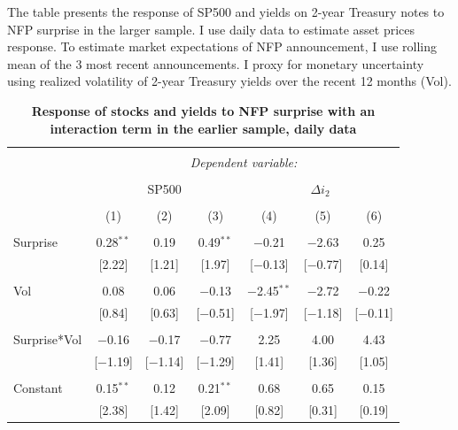 \documentclass[12pt]{article}
\begin{document}
\begin{table}[!htbp] \centering 
  \caption{\textbf{Response of stocks and yields to NFP surprise with an interaction term in the earlier sample, daily data}} 
  \label{} 
      \begin{flushleft}
    {\medskip\small
 The table presents the response of SP500 and yields on 2-year Treasury notes to NFP surprise in the larger sample. I use daily data to estimate asset prices response. To estimate market expectations of NFP announcement, I use rolling mean of the 3 most recent announcements. I proxy for monetary uncertainty using realized volatility of 2-year Treasury yields over the recent 12 months (Vol).}
    \medskip
    \end{flushleft}
\begin{tabular}{@{\extracolsep{1pt}}lcccccc} 
\\[-1.8ex]\hline 
\hline \\[-1.8ex] 
 & \multicolumn{6}{c}{\textit{Dependent variable:}} \\ 
\cline{2-7} 
\\[-1.8ex] & \multicolumn{3}{c}{SP500} & \multicolumn{3}{c}{$\Delta i_2$} \\ 
\\[-1.8ex] & (1) & (2) & (3) & (4) & (5) & (6)\\ 
\hline \\[-1.8ex] 
 Surprise & 0.28$^{**}$ & 0.19 & 0.49$^{**}$ & $-$0.21 & $-$2.63 & 0.25 \\ 
  & [2.22] & [1.21] & [1.97] & [$-$0.13] & [$-$0.77] & [0.14] \\ 
  & & & & & & \\ 
 Vol & 0.08 & 0.06 & $-$0.13 & $-$2.45$^{**}$ & $-$2.72 & $-$0.22 \\ 
  & [0.84] & [0.63] & [$-$0.51] & [$-$1.97] & [$-$1.18] & [$-$0.11] \\ 
  & & & & & & \\ 
 Surprise*Vol & $-$0.16 & $-$0.17 & $-$0.77 & 2.25 & 4.00 & 4.43 \\ 
  & [$-$1.19] & [$-$1.14] & [$-$1.29] & [1.41] & [1.36] & [1.05] \\ 
  & & & & & & \\ 
 Constant & 0.15$^{**}$ & 0.12 & 0.21$^{**}$ & 0.68 & 0.65 & 0.15 \\ 
  & [2.38] & [1.42] & [2.09] & [0.82] & [0.31] & [0.19] \\ 

\end{tabular}
\end{table}
\end{document}
